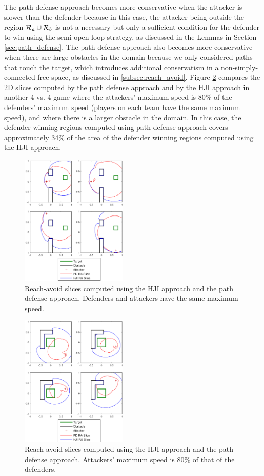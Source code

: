 The path defense approach becomes more conservative when the attacker is slower than the defender because in this case, the attacker being outside the region $\mathcal{R}_a \cup \mathcal{R}_b$ is not a necessary but only a sufficient condition for the defender to win using the semi-open-loop strategy, as discussed in the Lemmas in Section \ref{sec:path_defense}. The path defense approach also becomes more conservative when there are large obstacles in the domain because we only considered paths that touch the target, which introduces additional conservatism in a non-simply-connected free space, as discussed in \ref{subsec:reach_avoid}. Figure \ref{fig:comp_ml} compares the 2D slices computed by the path defense approach and by the HJI approach in another 4 vs. 4 game where the attackers' maximum speed is 80\% of the defenders' maximum speed (players on each team have the same maximum speed), and where there is a larger obstacle in the domain. In this case,  the defender winning regions computed using path defense approach covers approximately 34\% of the area of the defender winning regions computed using the HJI approach.

\begin{figure}
	\centering
	\includegraphics[width=0.45\textwidth]{"fig/OLGame_compare"}
	\caption{Reach-avoid slices computed using the HJI approach and the path defense approach. Defenders and attackers have the same maximum speed.}
	\label{fig:comp_ol}
\end{figure}

\begin{figure}
	\centering
	\includegraphics[width=0.45\textwidth]{"fig/midLGame_compare"}
	\caption{Reach-avoid slices computed using the HJI approach and the path defense approach. Attackers' maximum speed is 80\% of that of the defenders.}
	\label{fig:comp_ml}
\end{figure}

